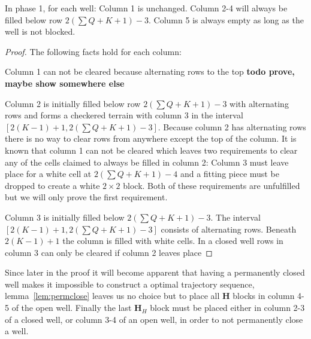 \bigbreak

\begin{lem}
In phase 1, for each well: Column 1 is unchanged. Column 2-4 will always be filled below row $2 \left( \sum Q + K + 1 \right) - 3$. Column 5 is always empty as long as the well is not blocked.
\end{lem}

\begin{proof}
The following facts hold for each column:

Column 1 can not be cleared because alternating rows to the top \textbf{todo prove, maybe show somewhere else}

Column 2 is initially filled below row $2 \left( \sum Q + K + 1 \right) - 3$ with alternating rows and forms a checkered terrain with column 3 in the interval $\left[ 2 \left( K - 1 \right) + 1, 2 \left( \sum Q + K + 1 \right) - 3 \right]$. Because column 2 has alternating rows there is no way to clear rows from anywhere except the top of the column. It is known that column 1 can not be cleared which leaves two requirements to clear any of the cells claimed to always be filled in column 2: Column 3 must leave place for a white cell at $2 \left( \sum Q + K + 1 \right) - 4$ and a fitting piece must be dropped to create a white $2 \times 2$ block. Both of these requirements are unfulfilled but we will only prove the first requirement.

Column 3 is initially filled below $2 \left( \sum Q + K + 1 \right) - 3$. The interval $\left[ 2 \left( K - 1 \right) + 1, 2 \left( \sum Q + K + 1 \right) - 3 \right]$ consists of alternating rows. Beneath $2 \left( K - 1 \right) + 1$ the column is filled with white cells. In a closed well rows in column 3 can only be cleared if column 2 leaves place 
\end{proof}

Since later in the proof it will become apparent that having a permanently closed well makes it impossible to construct a optimal trajectory sequence, lemma~\ref{lem:permclose} leaves us no choice but to place all $\mathbf{H}$ blocks in column 4-5 of the open well. Finally the last $\mathbf{H}_H$ block must be placed either in column 2-3 of a closed well, or column 3-4 of an open well, in order to not permanently close a well.

